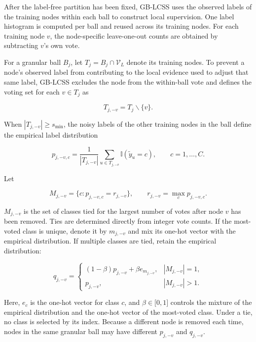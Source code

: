 \documentclass[preprint,12pt]{elsarticle}
\begin{document}
After the label-free partition has been fixed, GB-LCSS uses the observed labels of the training nodes within each ball to construct local supervision. One label histogram is computed per ball and reused across its training nodes. For each training node \(v\), the node-specific leave-one-out counts are obtained by subtracting \(v\)'s own vote.

For a granular ball \(B_{j}\), let \(T_{j} = B_{j} \cap \mathcal{V}_{L}\) denote its training nodes. To prevent a node's observed label from contributing to the local evidence used to adjust that same label, GB-LCSS excludes the node from the within-ball vote and defines the voting set for each \(v \in T_{j}\) as

\begin{equation}\label{eq:7}
T_{j, - v} = T_{j}\backslash\{ v\}.
\end{equation}

When \(|T_{j, - v}| \geq s_{\min}\), the noisy labels of the other training nodes in the ball define the empirical label distribution

\begin{equation}\label{eq:8}
p_{j, - v,c} = \frac{1}{|T_{j, - v}|}\sum_{u \in T_{j, - v}}\mathbb{I}({\widetilde{y}}_{u} = c),\quad\quad c = 1,\ldots,C.
\end{equation}

Let

\begin{equation}\label{eq:9}
M_{j, - v} = \{ c:p_{j, - v,c} = r_{j, - v}\},\quad\quad r_{j, - v} = \max_{c}p_{j, - v,c}.
\end{equation}

\(M_{j, - v}\) is the set of classes tied for the largest number of votes after node \(v\) has been removed. Ties are determined directly from integer vote counts. If the most-voted class is unique, denote it by \(m_{j, - v}\) and mix its one-hot vector with the empirical distribution. If multiple classes are tied, retain the empirical distribution:

\begin{equation}\label{eq:10}
q_{j, - v} = \begin{cases}
(1 - \beta)p_{j, - v} + \beta e_{m_{j, - v}}, & |M_{j, - v}| = 1, \\
p_{j, - v}, & |M_{j, - v}| > 1.
\end{cases}
\end{equation}

Here, \(e_{c}\) is the one-hot vector for class \(c\), and \(\beta \in \lbrack 0,1\rbrack\) controls the mixture of the empirical distribution and the one-hot vector of the most-voted class. Under a tie, no class is selected by its index. Because a different node is removed each time, nodes in the same granular ball may have different \(p_{j, - v}\) and \(q_{j, - v}\).
\end{document}

